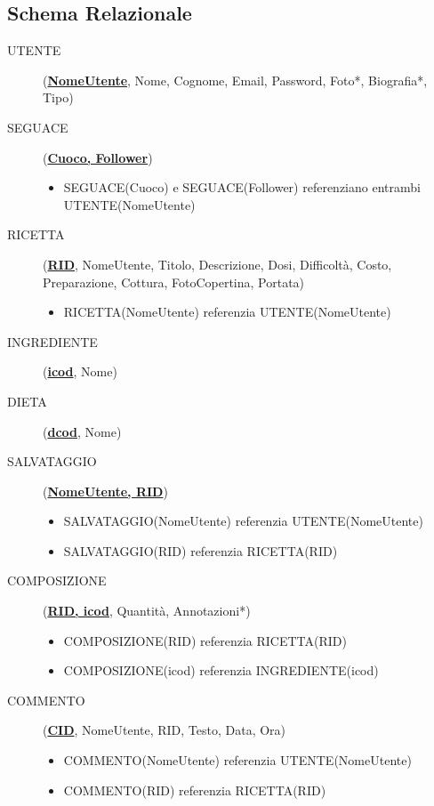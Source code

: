 \documentclass[12pt]{extarticle}
\begin{document}
\subsection{Schema Relazionale}
\begin{description}
    \item[UTENTE] (\textbf{\uline{NomeUtente}}, Nome, Cognome, Email, Password, Foto*, Biografia*, Tipo)
    \item[SEGUACE] (\textbf{\uline{Cuoco, Follower}}) 
    \begin{itemize}
        \item SEGUACE(Cuoco) e SEGUACE(Follower) referenziano entrambi UTENTE(NomeUtente)
    \end{itemize} 
    \item[RICETTA] (\textbf{\uline{RID}}, NomeUtente, Titolo, Descrizione, Dosi, Difficoltà, Costo, Preparazione, Cottura, FotoCopertina, Portata) 
    \begin{itemize}
        \item RICETTA(NomeUtente) referenzia UTENTE(NomeUtente)
    \end{itemize}
    \item[INGREDIENTE] (\textbf{\uline{icod}}, Nome)
    \item[DIETA] (\textbf{\uline{dcod}}, Nome)
    \item[SALVATAGGIO] (\textbf{\uline{NomeUtente, RID}})
    \begin{itemize}
        \item SALVATAGGIO(NomeUtente) referenzia UTENTE(NomeUtente)
        \item SALVATAGGIO(RID) referenzia RICETTA(RID)
    \end{itemize} 
    \item[COMPOSIZIONE] (\textbf{\uline{RID, icod}}, Quantità, Annotazioni*) 
    \begin{itemize}
        \item COMPOSIZIONE(RID) referenzia RICETTA(RID) 
        \item COMPOSIZIONE(icod) referenzia INGREDIENTE(icod)
    \end{itemize} 
    \item[COMMENTO] (\textbf{\uline{CID}}, NomeUtente, RID, Testo, Data, Ora)
    \begin{itemize}
        \item COMMENTO(NomeUtente) referenzia UTENTE(NomeUtente)
        \item COMMENTO(RID) referenzia RICETTA(RID)
    \end{itemize}

\end{description}
\end{document}
